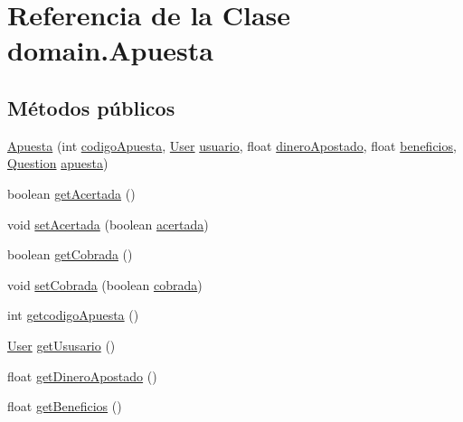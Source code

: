 \hypertarget{classdomain_1_1Apuesta}{}\section{Referencia de la Clase domain.\+Apuesta}
\label{classdomain_1_1Apuesta}
\subsection*{Métodos públicos}
\begin{DoxyCompactItemize}
\item 
\mbox{\hyperlink{classdomain_1_1Apuesta_a470f63c3f95a850ee19b7ef39ba8808e}{Apuesta}} (int \mbox{\hyperlink{classdomain_1_1Apuesta_afa9c90fb9ef5b0e4e674c14e8897f73c}{codigo\+Apuesta}}, \mbox{\hyperlink{classdomain_1_1User}{User}} \mbox{\hyperlink{classdomain_1_1Apuesta_a0d23f0bdf469bdfe1731964cf451feef}{usuario}}, float \mbox{\hyperlink{classdomain_1_1Apuesta_abad5a9f03d069677bfdcd8505fc9babb}{dinero\+Apostado}}, float \mbox{\hyperlink{classdomain_1_1Apuesta_acec50d5cb60237c9965be9f66d36e041}{beneficios}}, \mbox{\hyperlink{classdomain_1_1Question}{Question}} \mbox{\hyperlink{classdomain_1_1Apuesta_a43e71ee854e8e8b1447a707fc749d34b}{apuesta}})
\item 
boolean \mbox{\hyperlink{classdomain_1_1Apuesta_a5ca4b42ddce2ef92feacc2ac747fe140}{get\+Acertada}} ()
\item 
void \mbox{\hyperlink{classdomain_1_1Apuesta_a7a57b0ad3b625f2a7228809f59c2fcfa}{set\+Acertada}} (boolean \mbox{\hyperlink{classdomain_1_1Apuesta_a8adfa2717f26eeac6e6b9df3985f3a57}{acertada}})
\item 
boolean \mbox{\hyperlink{classdomain_1_1Apuesta_ae1983ee715a32fd095df5d54ab8475f1}{get\+Cobrada}} ()
\item 
void \mbox{\hyperlink{classdomain_1_1Apuesta_ac083871d9b4afb8707553c422ef247f2}{set\+Cobrada}} (boolean \mbox{\hyperlink{classdomain_1_1Apuesta_a32769c4fa66a117a3728faf31056a7a9}{cobrada}})
\item 
int \mbox{\hyperlink{classdomain_1_1Apuesta_a5e818409c0f8e3b9d1c812b60294d967}{getcodigo\+Apuesta}} ()
\item 
\mbox{\hyperlink{classdomain_1_1User}{User}} \mbox{\hyperlink{classdomain_1_1Apuesta_a4ca4ca8fbb35d45d55152bf0aaa9ff0e}{get\+Ususario}} ()
\item 
float \mbox{\hyperlink{classdomain_1_1Apuesta_a15f352d9fe3703d744745578a227ad27}{get\+Dinero\+Apostado}} ()
\item 
float \mbox{\hyperlink{classdomain_1_1Apuesta_aa228aed3dfebe83dbf9a0f15b7d339de}{get\+Beneficios}} ()

\end{DoxyCompactItemize}
